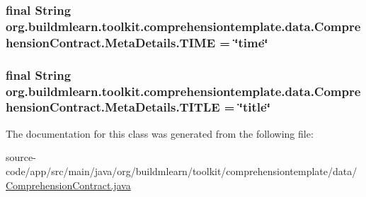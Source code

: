 \subsubsection[{\texorpdfstring{T\+I\+ME}{TIME}}]{\setlength{\rightskip}{0pt plus 5cm}final String org.\+buildmlearn.\+toolkit.\+comprehensiontemplate.\+data.\+Comprehension\+Contract.\+Meta\+Details.\+T\+I\+ME = \char`\"{}time\char`\"{}\hspace{0.3cm}{\ttfamily [static]}}\hypertarget{classorg_1_1buildmlearn_1_1toolkit_1_1comprehensiontemplate_1_1data_1_1ComprehensionContract_1_1MetaDetails_a0c3eb6a76bd96ffe5c02d93a53da9a7d}{}\label{classorg_1_1buildmlearn_1_1toolkit_1_1comprehensiontemplate_1_1data_1_1ComprehensionContract_1_1MetaDetails_a0c3eb6a76bd96ffe5c02d93a53da9a7d}
\subsubsection[{\texorpdfstring{T\+I\+T\+LE}{TITLE}}]{\setlength{\rightskip}{0pt plus 5cm}final String org.\+buildmlearn.\+toolkit.\+comprehensiontemplate.\+data.\+Comprehension\+Contract.\+Meta\+Details.\+T\+I\+T\+LE = \char`\"{}title\char`\"{}\hspace{0.3cm}{\ttfamily [static]}}\hypertarget{classorg_1_1buildmlearn_1_1toolkit_1_1comprehensiontemplate_1_1data_1_1ComprehensionContract_1_1MetaDetails_a9e37946a543befcbb2d6644692dc2d26}{}\label{classorg_1_1buildmlearn_1_1toolkit_1_1comprehensiontemplate_1_1data_1_1ComprehensionContract_1_1MetaDetails_a9e37946a543befcbb2d6644692dc2d26}


The documentation for this class was generated from the following file\+:\begin{DoxyCompactItemize}
\item 
source-\/code/app/src/main/java/org/buildmlearn/toolkit/comprehensiontemplate/data/\hyperlink{ComprehensionContract_8java}{Comprehension\+Contract.\+java}\end{DoxyCompactItemize}
